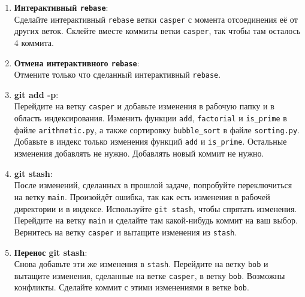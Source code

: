 \documentclass{article}
\begin{document}
\begin{enumerate}
\item \textbf{Интерактивный \texttt{rebase}}:\\
Сделайте интерактивный \texttt{rebase} ветки \texttt{casper} с момента отсоединения её от других веток. Склейте вместе коммиты ветки \texttt{casper}, так чтобы там осталось 4 коммита.

\item \textbf{Отмена интерактивного \texttt{rebase}}:\\
Отмените только что сделанный интерактивный \texttt{rebase}.

\item \textbf{\textbf{git add -p}}:\\
Перейдите на ветку \texttt{casper} и добавьте изменения в рабочую папку и в область индексирования. Изменить функции \texttt{add}, \texttt{factorial} и \texttt{is\_prime} в файле \texttt{arithmetic.py}, а также сортировку \texttt{bubble\_sort} в файле \texttt{sorting.py}. Добавьте в индекс только изменения функций \texttt{add} и \texttt{is\_prime}. Остальные изменения добавлять не нужно. Добавлять новый коммит не нужно.

\item \textbf{\textbf{git stash}}:\\
После изменений, сделанных в прошлой задаче, попробуйте переключиться на ветку \texttt{main}. Произойдёт ошибка, так как есть изменения в рабочей директории и в индексе. Используйте \texttt{git stash}, чтобы спрятать изменения. Перейдите на ветку \texttt{main} и сделайте там какой-нибудь коммит на ваш выбор. Вернитесь на ветку \texttt{casper} и вытащите изменения из \texttt{stash}.

\item \textbf{Перенос \textbf{git stash}}:\\
Снова добавьте эти же изменения в \texttt{stash}. Перейдите на ветку \texttt{bob} и вытащите изменения, сделанные на ветке \texttt{casper}, в ветку \texttt{bob}. Возможны конфликты. Сделайте коммит с этими изменениями в ветке \texttt{bob}.
\end{enumerate}
\end{document}
